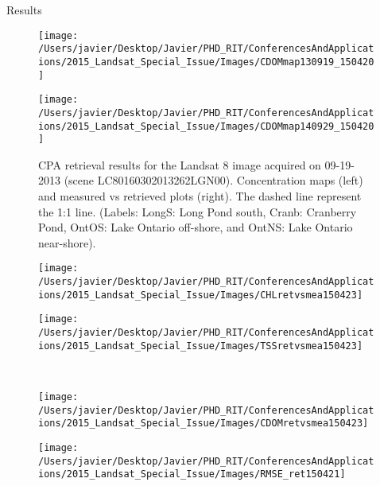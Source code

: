 \documentclass{beamer}
\begin{document}
\begin{frame}{}
\begin{columns}[t]
\begin{column}{.3\linewidth}
\begin{block}{Results}
\begin{figure}[htbp!]
  \begin{minipage}[c]{0.4\linewidth}
      \centering
      \texttt{[image: /Users/javier/Desktop/Javier/PHD\_RIT/ConferencesAndApplications/2015\_Landsat\_Special\_Issue/Images/CDOMmap130919\_150420]}  
  \end{minipage}
  \hspace{1cm}
  \begin{minipage}[c]{0.4\linewidth}
      \centering
      \texttt{[image: /Users/javier/Desktop/Javier/PHD\_RIT/ConferencesAndApplications/2015\_Landsat\_Special\_Issue/Images/CDOMmap140929\_150420]}  
  \end{minipage}
% 
  \caption{CPA retrieval results for the Landsat 8 image acquired on 09-19-2013 (scene LC80160302013262LGN00). Concentration maps (left) and measured vs retrieved plots (right). The dashed line represent the 1:1 line. (Labels: LongS: Long Pond south, Cranb: Cranberry Pond, OntOS: Lake Ontario off-shore, and OntNS: Lake Ontario near-shore). \label{fig:CPAsMaps130919} } 
\end{figure}


\begin{figure}[htb]
  \begin{minipage}[c]{0.32\linewidth}
      \texttt{[image: /Users/javier/Desktop/Javier/PHD\_RIT/ConferencesAndApplications/2015\_Landsat\_Special\_Issue/Images/CHLretvsmea150423]}  
  \end{minipage}
  \hspace{1cm}
  \begin{minipage}[d]{0.32\linewidth}
      \texttt{[image: /Users/javier/Desktop/Javier/PHD\_RIT/ConferencesAndApplications/2015\_Landsat\_Special\_Issue/Images/TSSretvsmea150423]}
  \end{minipage}\\
  \begin{minipage}[c]{0.32\linewidth}
      \texttt{[image: /Users/javier/Desktop/Javier/PHD\_RIT/ConferencesAndApplications/2015\_Landsat\_Special\_Issue/Images/CDOMretvsmea150423]}  
  \end{minipage}
  \hspace{1cm}
  \begin{minipage}[c]{0.32\linewidth}
      \texttt{[image: /Users/javier/Desktop/Javier/PHD\_RIT/ConferencesAndApplications/2015\_Landsat\_Special\_Issue/Images/RMSE\_ret150421]}
  \end{minipage}


\end{figure}
\end{block}
\end{column}
\end{columns}
\end{frame}
\end{document}
